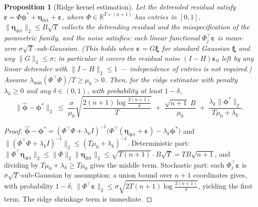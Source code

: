 \documentclass[10pt]{article} %
\theoremstyle{plain}
\newtheorem{proposition}{Proposition}
\theoremstyle{definition}
\begin{document}
\begin{proposition}[Ridge kernel estimation]
\label{prop:ridge}
Let the detrended residual satisfy
$\mathbf{r} = \Phi\boldsymbol{\phi}^{*} + \boldsymbol{\eta}_{\det}
+ \boldsymbol{\varepsilon}$, where
$\Phi\in\mathbb{R}^{T\times(n+1)}$ has entries in $[0,1]$,
$\|\boldsymbol{\eta}_{\det}\|_{2}\le B\sqrt{T}$ collects the
detrending residual and the misspecification of the parametric family,
and the noise satisfies: each linear functional
$\Phi_{j}^{\top}\boldsymbol{\varepsilon}$ is mean-zero
$\sigma\sqrt{T}$-sub-Gaussian. (This holds when
$\boldsymbol{\varepsilon}=G\boldsymbol{\xi}$ for standard Gaussian
$\boldsymbol{\xi}$ and any $\|G\|_{2}\le\sigma$; in particular it
covers the residual noise $(I-H)\boldsymbol{\varepsilon}_{0}$ left by
any linear detrender with $\|I-H\|_{2}\le 1$ --- independence of
entries is not required.) Assume
$\lambda_{\min}(\Phi^{\top}\Phi)/T \ge \mu_{0} > 0$. Then, for the
ridge estimator with penalty $\lambda_{k}\ge 0$ and any
$\delta\in(0,1)$, with probability at least $1-\delta$,
\begin{equation}
\|\hat{\boldsymbol{\phi}}-\boldsymbol{\phi}^{*}\|_{2}
\;\le\;
\frac{\sigma}{\mu_{0}}
\sqrt{\frac{2(n{+}1)\log\!\frac{2(n+1)}{\delta}}{T}}
\;+\;
\frac{\sqrt{n{+}1}\;B}{\mu_{0}}
\;+\;
\frac{\lambda_{k}\|\boldsymbol{\phi}^{*}\|_{2}}{T\mu_{0}+\lambda_{k}} .
\label{eq:ridge-bound}
\end{equation}
\end{proposition}

\begin{proof}
$\hat{\boldsymbol{\phi}}-\boldsymbol{\phi}^{*}
= (\Phi^{\top}\Phi+\lambda_{k}I)^{-1}
\bigl(\Phi^{\top}(\boldsymbol{\eta}_{\det}+\boldsymbol{\varepsilon})
- \lambda_{k}\boldsymbol{\phi}^{*}\bigr)$ and
$\|(\Phi^{\top}\Phi+\lambda_{k}I)^{-1}\|_{2}
\le (T\mu_{0}+\lambda_{k})^{-1}$. Deterministic part:
$\|\Phi^{\top}\boldsymbol{\eta}_{\det}\|_{2}
\le \|\Phi\|_{2}\|\boldsymbol{\eta}_{\det}\|_{2}
\le \sqrt{T(n{+}1)}\cdot B\sqrt{T} = TB\sqrt{n{+}1}$, and dividing by
$T\mu_{0}+\lambda_{k}\ge T\mu_{0}$ gives the middle term. Stochastic
part: each $\Phi_{j}^{\top}\boldsymbol{\varepsilon}$ is
$\sigma\sqrt{T}$-sub-Gaussian by assumption; a union
bound over $n{+}1$ coordinates gives, with probability $1-\delta$,
$\|\Phi^{\top}\boldsymbol{\varepsilon}\|_{2}
\le \sigma\sqrt{2T(n{+}1)\log\frac{2(n+1)}{\delta}}$, yielding the
first term. The ridge shrinkage term is immediate.
\end{proof}
\end{document}
